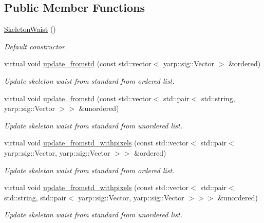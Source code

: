 \subsection*{Public Member Functions}
\begin{DoxyCompactItemize}
\item 
\mbox{\label{classassistive__rehab_1_1SkeletonWaist_a5eef608f89dca6afb2d1d833e5a969ea}} 
\mbox{\hyperlink{classassistive__rehab_1_1SkeletonWaist_a5eef608f89dca6afb2d1d833e5a969ea}{Skeleton\+Waist}} ()
\begin{DoxyCompactList}\small\item\em Default constructor. \end{DoxyCompactList}\item 
virtual void \mbox{\hyperlink{classassistive__rehab_1_1SkeletonWaist_ab7f2e60ea06acf791deb0b44b5a838ce}{update\+\_\+fromstd}} (const std\+::vector$<$ yarp\+::sig\+::\+Vector $>$ \&ordered)
\begin{DoxyCompactList}\small\item\em Update skeleton waist from standard from ordered list. \end{DoxyCompactList}\item 
virtual void \mbox{\hyperlink{classassistive__rehab_1_1SkeletonWaist_a88b7b4a3d8a0cf2916b5664fbb53d7ac}{update\+\_\+fromstd}} (const std\+::vector$<$ std\+::pair$<$ std\+::string, yarp\+::sig\+::\+Vector $>$$>$ \&unordered)
\begin{DoxyCompactList}\small\item\em Update skeleton waist from standard from unordered list. \end{DoxyCompactList}\item 
virtual void \mbox{\hyperlink{classassistive__rehab_1_1SkeletonWaist_ac18ad93c95f70de6398f79e3f3eedad1}{update\+\_\+fromstd\+\_\+withpixels}} (const std\+::vector$<$ std\+::pair$<$ yarp\+::sig\+::\+Vector, yarp\+::sig\+::\+Vector $>$$>$ \&ordered)
\begin{DoxyCompactList}\small\item\em Update skeleton waist from standard from ordered list. \end{DoxyCompactList}\item 
virtual void \mbox{\hyperlink{classassistive__rehab_1_1SkeletonWaist_a50e77bb59f930e1be33ee0d3b39f74f8}{update\+\_\+fromstd\+\_\+withpixels}} (const std\+::vector$<$ std\+::pair$<$ std\+::string, std\+::pair$<$ yarp\+::sig\+::\+Vector, yarp\+::sig\+::\+Vector $>$$>$$>$ \&unordered)
\begin{DoxyCompactList}\small\item\em Update skeleton waist from standard from unordered list. \end{DoxyCompactList}\item 

\end{DoxyCompactItemize}
